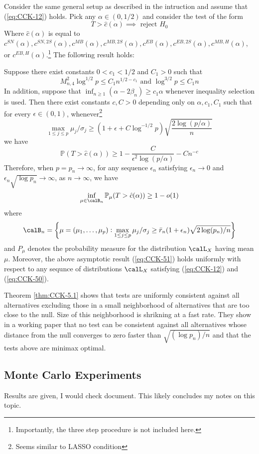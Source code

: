 Consider the same general setup as described in the intruction and assume that (\ref{eq:CCK-12}) holds. Pick any $\alpha \in (0,1/2)$ and consider the test of the form 
\[T > \hat{c}(\alpha) \implies \text{ reject }H_0\]
Where $\hat{c}(\alpha)$ is equal to $c^{SN}(\alpha), c^{SN,2S}(\alpha), c^{MB}(\alpha), c^{MB,2S}(\alpha), c^{EB}(\alpha), c^{EB,2S}(\alpha), c^{MB,H}(\alpha)$, or $c^{EB,H}(\alpha).$\footnote{Importantly, the three step procedure is not included here.} The following result holds:
\begin{theorem}
	\label{thm:CCK-5.1}
	Suppose there exist constants $0 < c_1 < 1/2$ and $C_1 > 0$ such that 
	\begin{equation}
		\label{eq:CCK-50}
		M_{n,4}^2 \log^{1/2}p \leq C_1 n^{1/2 - c_1}\text{ and }\log^{3/2}p \leq C_1 n
	\end{equation}
	In addition, suppose that $\inf_{n\geq 1}(\alpha - 2\beta_n)\geq c_1 \alpha$ whenever inequality selection is used. Then there exist constants $c,C > 0$ depending only on $\alpha, c_1, C_1$ such that for every $\epsilon \in (0,1)$, whenever\footnote{Seems similar to LASSO condition}
	\[\max_{1\leq j \leq p} \mu_j/\sigma_j \geq (1 + \epsilon + C\log^{-1/2} p)\sqrt{\frac{2\log(p/\alpha)}{n}}\]
	we have 
	\[\mathbb{P}(T > \hat{c}(\alpha)) \geq 1 - \frac{C}{\epsilon^2 \log(p/\alpha)} - Cn^{-c}\]
	Therefore, when $p = p_n \rightarrow \infty$, for any sequence $\epsilon_n$ satisfying $\epsilon_n \rightarrow 0$ and $\epsilon_n\sqrt{\log p_n}\rightarrow\infty$, as $n \rightarrow \infty$, we have 
	\begin{equation}
		\label{eq:CCK-51}
		\inf_{\mu\in\calB_n} \mathbb{P}_\mu(T > \hat{c}(\alpha)) \geq 1 - o(1)
	\end{equation}
	where 
	\[\calB_n = \left\{\mu = (\mu_1, \dots, \mu_p): \max_{1 \leq j \leq p} \mu_j/\sigma_j \geq \bar{r}_n (1+ \epsilon_n)\sqrt{2\log(p_n)/n}\right\}\]
	and $P_\mu$ denotes the probability measure for the distribution $\calL_X$ having mean $\mu$. Moreover, the above asymptotic result (\ref{eq:CCK-51}) holds uniformly with respect to any sequnce of distributions $\calL_X$ satisfying (\ref{eq:CCK-12}) and (\ref{eq:CCK-50}).
\end{theorem}
Theorem \ref{thm:CCK-5.1} shows that tests are uniformly consistent against all alternatives excluding those in a small neighborhood of alternatives that are too close to the null. Size of this neighborhood is shrikning at a fast rate. They show in a working paper that no test can be consistent against all alternatives whose distance from the null converges to zero faster than $\sqrt{(\log p_n)/n}$ and that the tests above are minimax optimal.

\subsection{Monte Carlo Experiments}

Results are given, I would check document. This likely concludes my notes on this topic. 
